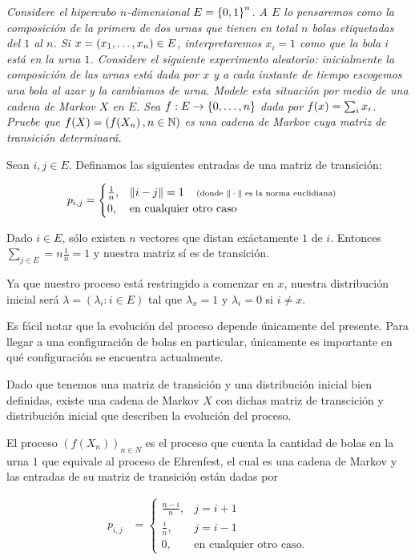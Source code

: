 \emph{
	Considere el hipercubo $n$-dimensional $E=\left\{ 0,1\right\} ^n$. A $E$ lo pensaremos como la composici\'on 
	de la primera de dos urnas que tienen en total $n$ bolas etiquetadas del $1$ al $n$. 
	Si $x=\left( x_1,\ldots, x_n\right) \in E$, interpretaremos $x_i=1$ como que la bola $i$ est\'a en la urna $1$. 
	Considere el siguiente experimento aleatorio: inicialmente la composici\'on de las urnas est\'a dada por 
	$x$ y a cada instante de tiempo escogemos una bola al azar y la cambiamos de urna. 
	Modele esta situaci\'on por medio de una cadena de Markov $X$ en $E$. Sea $f:E\to \left\{ 0,\ldots, n\right\} $ 
	dada por $f\!\left( x\right) =\sum_i x_i$. Pruebe que $f\!\left( X\right) =\left( f\!\left( X_n\right) ,n\in\mathbb{N}\right) $ es una cadena de 
	Markov cuya matriz de transici\'on determinar\'a.
}
\afterstatement\pn

Sean $i,j \in E$. Definamos las siguientes entradas de una matriz de transición:

\begin{align}
        p_{i,j} &=   
                    \begin{cases}
                        \frac{1}{n},    &       \|i-j\| = 1 \;\;\;\;\mbox{{\scriptsize(donde $\|\cdot\|$ es la norma euclidiana)}}  \\
                        0,              &       \text{en cualquier otro caso}
                    \end{cases}
\end{align}

Dado $i \in E$, sólo existen $n$ vectores que distan exáctamente $1$ de $i$. Entonces 
$\sum_{j \in E} = n \frac{1}{n} = 1$ y nuestra matriz sí es de transición.\pn

Ya que nuestro proceso está restringido a comenzar en $x$, nuestra distribución inicial
será $\lambda = (\lambda_i : i \in E)$ tal que $\lambda_x = 1$ y $\lambda_i = 0$ si $i \not= x$.\pn

Es fácil notar que la evolución del proceso depende únicamente del presente. Para llegar a una configuración
de bolas en particular, únicamente es importante en qué configuración se encuentra actualmente.\pn

Dado que tenemos una matriz de transición y una distribución inicial bien definidas, existe una cadena de
Markov $X$ con dichas matriz de transcición y distribución inicial que describen la evolución del proceso.\pn

El proceso $(f(X_n))_{n \in N}$ es el proceso que cuenta la cantidad de bolas en la urna $1$ que equivale al proceso
de Ehrenfest, el cual es una cadena de Markov y las entradas de su matriz de transición están dadas por

\begin{align}
        p_{i,j}     &=  
                        \begin{cases}
                            \frac{n-i}{n},  &   j=i+1   \\
                            \frac{i}{n},    &   j=i-1   \\
                            0,              &   \text{en cualquier otro caso.}
                        \end{cases}
\end{align}